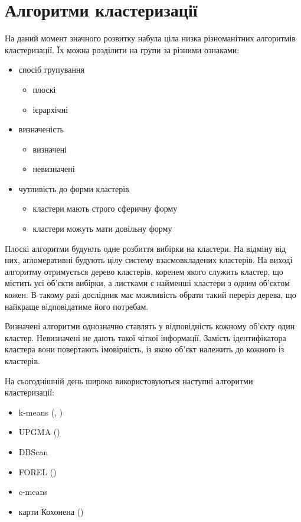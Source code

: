     
    
\section{Алгоритми кластеризації}
    На даний момент значного розвитку набула ціла низка різноманітних алгоритмів кластеризації. Їх можна розділити на групи за різними ознаками:
    \begin{itemize}
        \item спосіб групування
            \begin{itemize}
                \item плоскі
                \item ієрархічні
            \end{itemize}
        \item визначеність 
            \begin{itemize}
                \item визначені
                \item невизначені
            \end{itemize}
        \item чутливість до форми кластерів 
            \begin{itemize}
                \item кластери мають строго сферичну форму
                \item кластери можуть мати довільну форму
            \end{itemize}
    \end{itemize}
    
    Плоскі алгоритми будують одне розбиття вибірки на кластери. На відміну від них, агломеративні будують цілу систему взаємовкладених кластерів. На виході алгоритму отримується дерево кластерів, коренем якого служить кластер, що містить усі об'єкти вибірки, а листками є найменші кластери з одним об'єктом кожен. В такому разі дослідник має можливість обрати такий переріз дерева, що найкраще відповідатиме його потребам.
    
    Визначені алгоритми однозначно ставлять у відповідність кожному об'єкту один кластер. Невизначені не дають такої чіткої інформації. Замість ідентифікатора кластера вони повертають імовірність, із якою об'єкт належить до кожного із кластерів.
    
    На сьогоднішній день широко використовуються наступні алгоритми кластеризації:
    \begin{itemize}
        \item k-means (\cite{Steinhaus}, \cite{MacQueen})
        \item UPGMA (\cite{SokalMichener})
        \item DBScan
        \item FOREL (\cite{Zagorujko})
        \item c-means
        \item карти Кохонена (\cite{Rosenblatt})
    \end{itemize}
